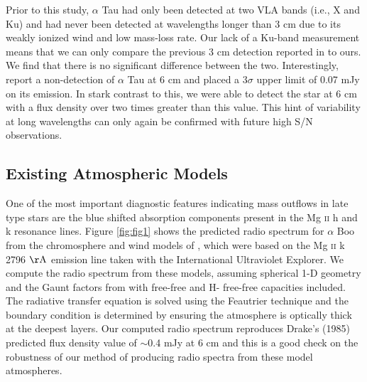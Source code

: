 \documentclass[iop]{emulateapj}
\begin{document}
Prior to this study, $\alpha$ Tau had only been detected at two VLA bands (i.e., X and Ku) and had never been detected at wavelengths longer than 3 cm due to its weakly ionized wind and low mass-loss rate. Our lack of a Ku-band measurement means that we can only compare the previous 3 cm detection reported in \cite{2007ApJ...655..946W} to ours. We find that there is no significant difference between the two. Interestingly, \cite{2007ApJ...655..946W} report a non-detection of $\alpha$ Tau at 6 cm and placed a 3$\sigma$ upper limit of 0.07 mJy on its emission. In stark contrast to this, we were able to detect the star at 6 cm with a flux density over two times greater than this value. This hint of variability at long wavelengths can only again be confirmed with future high S/N observations.


\subsection{Existing Atmospheric Models} \label{disc2}
One of the most important diagnostic features indicating mass outflows in late type stars are the blue shifted absorption components present in the Mg {\textsc{ii}} h and k resonance lines. Figure \ref{fig:fig1} shows the predicted radio spectrum for $\alpha$ Boo from the chromosphere and wind models of \cite{1985pssl.proc..351D}, which were based on the Mg {\textsc{ii}} k 2796 $\rm{\AA}$ emission line taken with the International Ultraviolet Explorer. We compute the radio spectrum from these models, assuming spherical 1-D geometry and the Gaunt factors from \cite{1988ApJ...327..477H} with free-free and H- free-free capacities included. The radiative transfer equation is solved using the Feautrier technique \cite[see, e.g.,][]{1994MNRAS.268..894H} and the boundary condition is determined by ensuring the atmosphere is optically thick at the deepest layers. Our computed radio spectrum reproduces Drake's (1985) predicted flux density value of $\sim$0.4 mJy at 6 cm and this is a good check on the robustness of our method of producing radio spectra from these model atmospheres. 
\end{document}
